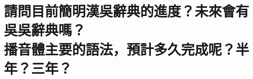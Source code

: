 %

\chapter[請問目前簡明漢吳辭典的進度？未來會有吳吳辭典嗎？ 播音體主要的語法，預計多久完成呢？半年？三年？]{請問目前簡明漢吳辭典的進度？未來會有吳吳辭典嗎？ \\[0.35em] 播音體主要的語法，預計多久完成呢？半年？三年？}

